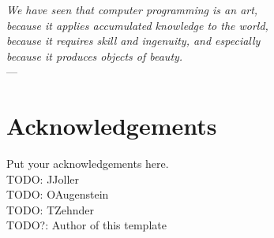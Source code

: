 

\begin{flushright}{\slshape    
We have seen that computer programming is an art, \\ 
because it applies accumulated knowledge to the world, \\ 
because it requires skill and ingenuity, and especially \\
because it produces objects of beauty.} \\ \medskip
---  \citep{knuth:1974}
\end{flushright}

\bigskip


\begingroup

\let\clearpage\relax
\let\cleardoublepage\relax
\let\cleardoublepage\relax

\chapter*{Acknowledgements} %

Put your acknowledgements here.\\

\noindent TODO: JJoller \\

\noindent TODO: OAugenstein \\

\noindent TODO: TZehnder \\

\noindent TODO?: Author of this template \\

\endgroup
